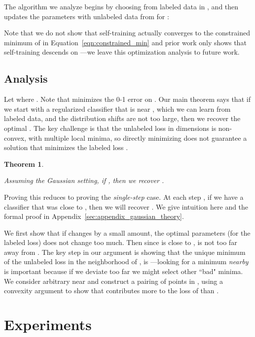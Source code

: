 \documentclass[11pt]{article}
\newtheorem{theorem}{Theorem}[section]
\begin{document}
The algorithm we analyze begins by choosing  from labeled data in , and then updates the parameters with unlabeled data from  for :


Note that we do not show that self-training actually converges to the constrained minimum of  in Equation~\eqref{eqn:constrained_min} and prior work only shows that self-training descends on ---we leave this optimization analysis to future work.

\subsection{Analysis}

Let  where .
Note that  minimizes the 0-1 error on .
Our main theorem says that if we start with a regularized classifier  that is near , which we can learn from labeled data, and the distribution shifts  are not too large, then we recover the optimal .
The key challenge is that the unlabeled loss  in  dimensions is non-convex, with multiple local minima, so directly minimizing  does not guarantee a solution that minimizes the labeled loss .

\newcommand{\gaussianTheoremText}{
Assuming the Gaussian setting, if , then we recover .
}

\begin{theorem}
\label{thm:gaussian}
\gaussianTheoremText{}
\end{theorem}

Proving this reduces to proving the \emph{single-step} case. At each step , if we have a classifier  that was close to , then we will recover . We give intuition here and the formal proof in Appendix~\ref{sec:appendix_gaussian_theory}.

We first show that if  changes by a small amount, the optimal parameters (for the labeled loss) does not change too much.
Then since  is close to ,  is not too far away from .
The key step in our argument is showing that the unique minimum of the unlabeled loss  in the neighborhood of , is ---looking for a minimum \emph{nearby} is important because if we deviate too far we might select other ``bad" minima.
We consider arbitrary  near  and construct a pairing of points  in , using a convexity argument to show that  contributes more to the loss of  than .


 
\section{Experiments}
\label{sec:experiments}
\end{document}

